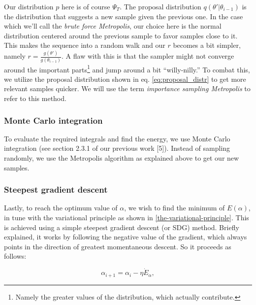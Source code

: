 \documentclass[
]{article}
\begin{document}
Our distribution \(p\) here is of course \(\Psi_T\). The proposal
distribution \(q(\theta'|\theta_{i-1})\) is the distribution that
suggests a new sample given the previous one. In the case which we'll
call the \emph{brute force Metropolis}, our choice here is the normal
distribution centered around the previous sample to favor samples close
to it. This makes the sequence into a random walk and our \(r\) becomes
a bit simpler, namely \(r = \frac{g(\theta')}{g(\theta_{i-1})}\). A flaw
with this is that the sampler might not converge around the important
parts\footnote{Namely the greater values of the distribution, which
  actually contribute.} and jump around a bit ``willy-nilly.'' To combat
this, we utilize the proposal distribution shown in eq.
\eqref{eq:proposal_distr} to get more relevant samples quicker. We will
use the term \emph{importance sampling Metropolis} to refer to this
method.

\hypertarget{monte-carlo-integration}{%
\subsubsection*{Monte Carlo integration}\label{monte-carlo-integration}}

To evaluate the required integrals and find the energy, we use Monte
Carlo integration (see section 2.3.1 of our previous work {[}5{]}).
Instead of sampling randomly, we use the Metropolis algorithm as
explained above to get our new samples.

\hypertarget{steepest-gradient-descent}{%
\subsubsection*{Steepest gradient
descent}\label{steepest-gradient-descent}}

Lastly, to reach the optimum value of \(\alpha\), we wish to find the
minimum of \(E(\alpha)\), in tune with the variational principle as
shown in \ref{the-variational-principle}. This is achieved using a
simple steepest gradient descent (or SDG) method. Briefly explained, it
works by following the negative value of the gradient, which always
points in the direction of greatest momentaneous descent. So it proceeds
as follows:

\begin{equation} \alpha_{i+1} = \alpha_i - \eta \dot E_\alpha,\label{eq:sgd}\end{equation}
\end{document}
